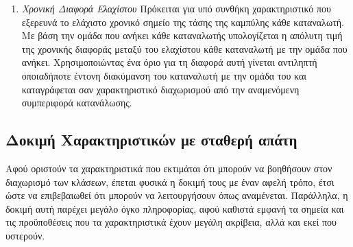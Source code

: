 \begin{enumerate}
\begin{center}
\end{center}
\item{\textit{Χρονική Διαφορά Ελαχίστου}} Πρόκειται για υπό συνθήκη χαρακτηριστικό που εξερευνά το ελάχιστο χρονικό σημείο της τάσης της καμπύλης κάθε καταναλωτή. Με βάση την ομάδα που ανήκει κάθε καταναλωτής υπολογίζεται η απόλυτη τιμή της χρονικής διαφοράς μεταξύ του ελαχίστου κάθε καταναλωτή με την ομάδα που ανήκει. Χρησιμοποιώντας ένα όριο για τη διαφορά αυτή γίνεται αντιληπτή οποιαδήποτε έντονη διακύμανση του καταναλωτή με την ομάδα του και καταγράφεται σαν χαρακτηριστικό διαχωρισμού από την αναμενόμενη συμπεριφορά κατανάλωσης.
\begin{center}
\end{center}
\end{enumerate}

\subsection{Δοκιμή Χαρακτηριστικών με σταθερή απάτη}
Αφού οριστούν τα χαρακτηριστικά που εκτιμάται ότι μπορούν να βοηθήσουν στον διαχωρισμό των κλάσεων, έπεται φυσικά η δοκιμή τους με έναν αφελή τρόπο, έτσι ώστε να επιβεβαιωθεί ότι μπορούν να λειτουργήσουν όπως αναμένεται. Παράλληλα, η δοκιμή αυτή παρέχει μεγάλο όγκο πληροφορίας, αφού καθιστά εμφανή τα σημεία και τις προϋποθέσεις που τα χαρακτηριστικά έχουν μεγάλη ακρίβεια, αλλά και εκεί που υστερούν.

